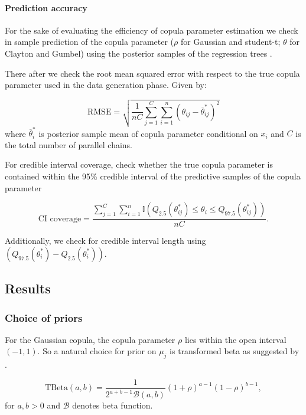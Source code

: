 \documentclass{amsart}
\begin{document}
\paragraph{Prediction accuracy} For the sake of evaluating the efficiency of copula parameter estimation we check in sample prediction of the copula parameter ($\rho$ for Gaussian and student-t; $\theta$ for Clayton and Gumbel) using the posterior samples of the regression trees . 

There after we check the root mean squared error with respect to the true copula parameter used in the data generation phase. Given by:

\begin{equation}
	\text{RMSE} = \sqrt{\frac{1}{nC}\sum_{j=1}^C \sum_{i=1}^n (\theta_{ij} - \overline{\theta}^*_{ij})^2}
\end{equation}
where $\overline{\theta}^*_i$ is posterior sample mean of copula parameter conditional on $x_i$ and $C$ is the total number of parallel chains.

For credible interval coverage, check whether the true copula parameter is contained within the 95\% credible interval of the predictive samples of the copula parameter

\begin{equation}
	\text{CI coverage} = \frac{\sum_{j=1}^C\sum_{i=1}^n\mathbb{I}\left(Q_{2.5}(\theta^*_{ij}) \le \theta_i \le Q_{97.5}(\theta^*_{ij})\right)}{nC}.
\end{equation}

Additionally, we check for credible interval length using $\left(Q_{97.5}(\theta^*_i) - Q_{2.5}(\theta^*_i)\right)$.

\subsection{Results}

\subsubsection{Choice of priors} For the Gaussian copula, the copula parameter $\rho$ lies within the open interval $(-1,1)$. So a natural choice for prior on $\mu_j$ is transformed beta as suggested by \citet{gokhale_prior_cor}. 

\begin{equation}
	\text{TBeta}(a, b) = \frac{1}{2^{a+b-1}\mathcal{B}(a,b)}(1+\rho)^{a-1}(1-\rho)^{b-1},
\end{equation}
for $a,b>0$ and $\mathcal{B}$ denotes beta function. 
\end{document}
